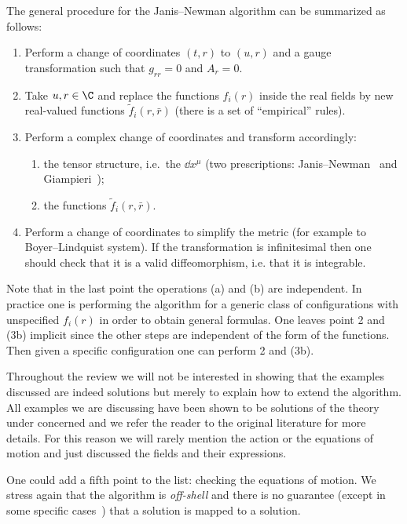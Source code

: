 The general procedure for the Janis--Newman algorithm can be summarized as follows:
\begin{enumerate}
	\item Perform a change of coordinates $(t, r)$ to $(u, r)$ and a gauge transformation such that $g_{rr} = 0$ and $A_r = 0$.
	
	\item Take $u, r \in \C$ and replace the functions $f_i(r)$ inside the real fields by new real-valued functions $\tilde f_i(r, \bar r)$ (there is a set of “empirical” rules).
	
	\item Perform a complex change of coordinates and transform accordingly:
	\begin{enumerate}
		\item the tensor structure, i.e.\ the $\dd x^\mu$ (two prescriptions: Janis--Newman~\cite{Newman:1965:NoteKerrSpinningParticle} and Giampieri~\cite{Giampieri:1990:IntroducingAngularMomentum});
		\label{algo:list:procedure-tensor}
		
		\item the functions $\tilde f_i(r, \bar r)$.
		\label{algo:list:procedure-functions}
	\end{enumerate}
	
	\item Perform a change of coordinates to simplify the metric (for example to Boyer--Lindquist system).
	If the transformation is infinitesimal then one should check that it is a valid diffeomorphism, i.e. that it is integrable.
\end{enumerate}
Note that in the last point the operations (a) and (b) are independent.
In practice one is performing the algorithm for a generic class of configurations with unspecified $f_i(r)$ in order to obtain general formulas.
One leaves point 2 and (3b) implicit since the other steps are independent of the form of the functions.
Then given a specific configuration one can perform 2 and (3b).

Throughout the review we will not be interested in showing that the examples discussed are indeed solutions but merely to explain how to extend the algorithm.
All examples we are discussing have been shown to be solutions of the theory under concerned and we refer the reader to the original literature for more details.
For this reason we will rarely mention the action or the equations of motion and just discussed the fields and their expressions.

One could add a fifth point to the list: checking the equations of motion.
We stress again that the algorithm is \emph{off-shell} and there is no guarantee (except in some specific cases~\cite{Adamo:2014:KerrNewmanMetricReview}) that a solution is mapped to a solution.


